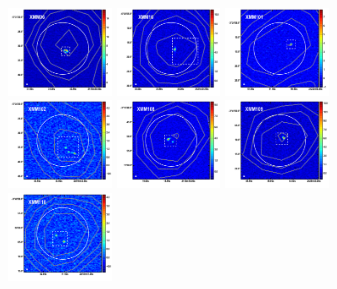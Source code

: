 \documentclass[iop]{emulateapj}
\begin{document}
\begin{figure}[!tbp] 
    \begin{centering}
\includegraphics[width=0.245\textwidth]{../Figures/overlays/XMM06_870_250.pdf}
\includegraphics[width=0.245\textwidth]{../Figures/overlays/XMM16_870_250.pdf}
\includegraphics[width=0.245\textwidth]{../Figures/overlays/XMM101_870_250.pdf}
\includegraphics[width=0.245\textwidth]{../Figures/overlays/XMM102_870_250.pdf}
\includegraphics[width=0.245\textwidth]{../Figures/overlays/XMM108_870_250.pdf}
\includegraphics[width=0.245\textwidth]{../Figures/overlays/XMM109_870_250.pdf}
\includegraphics[width=0.245\textwidth]{../Figures/overlays/XMM110_870_250.pdf}

\end{centering}
\end{figure}
\end{document}
